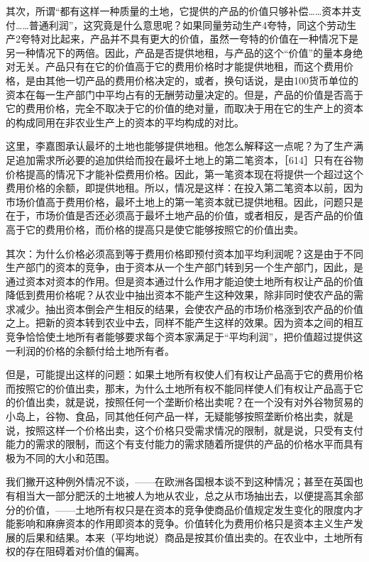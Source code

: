其次，所谓“都有这样一种质量的土地，它提供的产品的价值只够补偿……资本并支付……普通利润”，这究竟是什么意思呢？如果同量劳动生产4夸特，同这个劳动生产2夸特对比起来，产品并不具有更大的价值，虽然一夸特的价值在一种情况下是另一种情况下的两倍。因此，产品是否提供地租，与产品的这个“价值”的量本身绝对无关。产品只有在它的价值高于它的费用价格时才能提供地租，而这个费用价格，是由其他一切产品的费用价格决定的，或者，换句话说，是由100货币单位的资本在每一生产部门中平均占有的无酬劳动量决定的。但是，产品的价值是否高于它的费用价格，完全不取决于它的价值的绝对量，而取决于用在它的生产上的资本的构成同用在非农业生产上的资本的平均构成的对比。



这里，李嘉图承认最坏的土地也能够提供地租。他怎么解释这一点呢？为了生产满足追加需求所必要的追加供给而投在最坏土地上的第二笔资本，［614］只有在谷物价格提高的情况下才能补偿费用价格。因此，第一笔资本现在将提供一个超过这个费用价格的余额，即提供地租。所以，情况是这样：在投入第二笔资本以前，因为市场价值高于费用价格，最坏土地上的第一笔资本就已提供地租。因此，问题只是在于，市场价值是否还必须高于最坏土地产品的价值，或者相反，是否产品的价值高于它的费用价格，而价格的提高只是使它能够按照它的价值出卖。

其次：为什么价格必须高到等于费用价格即预付资本加平均利润呢？这是由于不同生产部门的资本的竞争，由于资本从一个生产部门转到另一个生产部门，因此，是通过资本对资本的作用。但是资本通过什么作用才能迫使土地所有权让产品的价值降低到费用价格呢？从农业中抽出资本不能产生这种效果，除非同时使农产品的需求减少。抽出资本倒会产生相反的结果，会使农产品的市场价格涨到农产品的价值之上。把新的资本转到农业中去，同样不能产生这样的效果。因为资本之间的相互竞争恰恰使土地所有者能够要求每个资本家满足于“平均利润”，把价值超过提供这一利润的价格的余额付给土地所有者。

但是，可能提出这样的问题：如果土地所有权使人们有权让产品高于它的费用价格而按照它的价值出卖，那末，为什么土地所有权不能同样使人们有权让产品高于它的价值出卖，就是说，按照任何一个垄断价格出卖呢？在一个没有对外谷物贸易的小岛上，谷物、食品，同其他任何产品一样，无疑能够按照垄断价格出卖，就是说，按照这样一个价格出卖，这个价格只受需求情况的限制，就是说，只受有支付能力的需求的限制，而这个有支付能力的需求随着所提供的产品的价格水平而具有极为不同的大小和范围。

我们撇开这种例外情况不谈，——在欧洲各国根本谈不到这种情况；甚至在英国也有相当大一部分肥沃的土地被人为地从农业，总之从市场抽出去，以便提高其余部分的价值，——土地所有权只是在资本的竞争使商品价值规定发生变化的限度内才能影响和麻痹资本的作用即资本的竞争。价值转化为费用价格只是资本主义生产发展的后果和结果。本来（平均地说）商品是按其价值出卖的。在农业中，土地所有权的存在阻碍着对价值的偏离。

